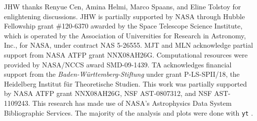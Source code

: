\documentclass[apjl]{emulateapj}
\begin{document}
\acknowledgments

JHW thanks Renyue Cen, Amina Helmi, Marco Spaans, and Eline Tolstoy
for enlightening discussions.  JHW is partially supported by NASA
through Hubble Fellowship grant \#120-6370 awarded by the Space
Telescope Science Institute, which is operated by the Association of
Universities for Research in Astronomy, Inc., for NASA, under contract
NAS 5-26555.  MJT and MLN acknowledge partial support from NASA ATFP
grant NNX08AH26G.  Computational resources were provided by NASA/NCCS
award SMD-09-1439.  TA acknowledges financial support from the {\em
  Baden-W\"{u}rttemberg-Stiftung} under grant P-LS-SPII/18, the
Heidelberg Institut f\"ur Theoretische Studien. This work was
partially supported by NASA ATFP grant NNX08AH26G, NSF AST-0807312,
and NSF AST-1109243. This research has made use of NASA’s Astrophysics
Data System Bibliographic Services.  The majority of the analysis and
plots were done with \texttt{yt} \citep{yt_full_paper}.

%

\end{document}
